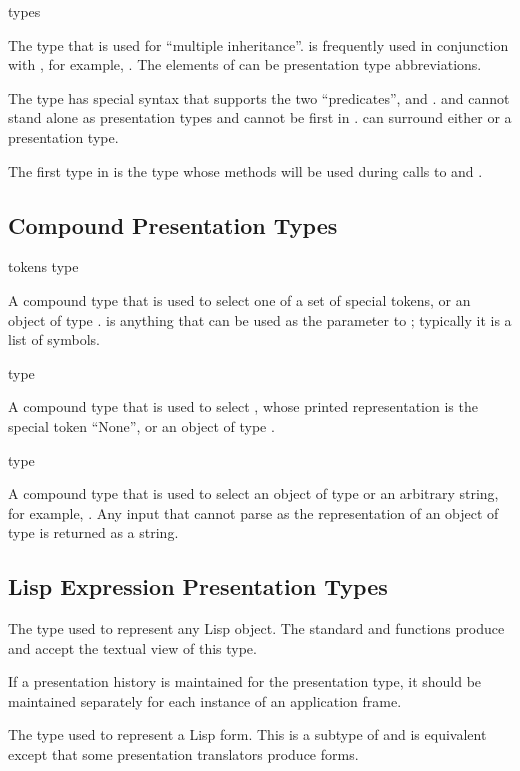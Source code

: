  {\rest types}

The type that is used for ``multiple inheritance''.   is frequently used
in conjunction with , for example, .  The elements of  can be presentation type abbreviations.

The  type has special syntax that supports the two ``predicates'',
 and .   and  cannot stand alone as
presentation types and cannot be first in .   can surround
either  or a presentation type.

The first type in  is the type whose methods will be used during
calls to  and .


\subsection {Compound Presentation Types}

 {tokens type}

A compound type that is used to select one of a set of special tokens, or an
object of type .   is anything that can be used as the
 parameter to ; typically it is a list of
symbols.


 {type}

A compound type that is used to select , whose printed representation is
the special token ``None'', or an object of type .


 {type}

A compound type that is used to select an object of type  or an
arbitrary string, for example, .  Any input that
 cannot parse as the representation of an object of type 
is returned as a string.


\subsection {Lisp Expression Presentation Types}

 {}

The type used to represent any Lisp object.  The standard  and
 functions produce and accept the textual view of this type.

If a presentation history is maintained for the  presentation
type, it should be maintained separately for each instance of an application
frame.

 {}

The type used to represent a Lisp form.  This is a subtype of 
and is equivalent except that some presentation translators produce 
forms.
